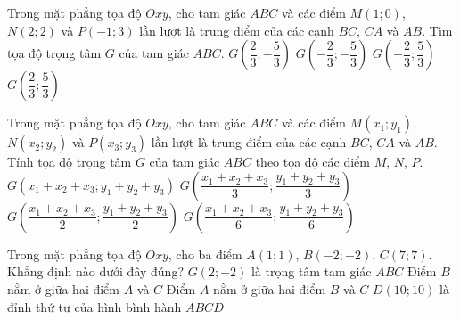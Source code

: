 \begin{ex}%
	Trong mặt phẳng tọa độ $Oxy$, cho tam giác $ABC$ và các điểm $M(1;0)$, $N(2;2)$ và $P(-1;3)$ lần lượt là trung điểm của các cạnh $BC$, $CA$ và $AB$. Tìm tọa độ trọng tâm $G$ của tam giác $ABC.$
	\choice
	{$G\left(\dfrac{2}{3};-\dfrac{5}{3}\right)$}
	{$G\left(-\dfrac{2}{3};-\dfrac{5}{3}\right)$}
	{$G\left(-\dfrac{2}{3};\dfrac{5}{3}\right)$}
	{\True $G\left(\dfrac{2}{3};\dfrac{5}{3}\right)$}
\end{ex}

\begin{ex}%
	Trong mặt phẳng tọa độ $Oxy$, cho tam giác $ABC$ và các điểm $M(x_1;y_1)$, $N(x_2;y_2)$ và $P(x_3;y_3)$ lần lượt là trung điểm của các cạnh $BC$, $CA$ và $AB$. Tính tọa độ trọng tâm $G$ của tam giác $ABC$ theo tọa độ các điểm $M$, $N$, $P$.
	\choice
	{$G\left(x_1+x_2+x_3;y_1+y_2+y_3\right)$}
	{\True $G\left(\dfrac{x_1+x_2+x_3}{3};\dfrac{y_1+y_2+y_3}{3}\right)$}
	{$G\left(\dfrac{x_1+x_2+x_3}{2};\dfrac{y_1+y_2+y_3}{2}\right)$}
	{$G\left(\dfrac{x_1+x_2+x_3}{6};\dfrac{y_1+y_2+y_3}{6}\right)$}
\end{ex}

\begin{ex}%
	Trong mặt phẳng tọa độ $Oxy$, cho ba điểm $A(1;1)$, $B(-2;-2)$, $C(7;7)$. Khẳng định nào dưới đây đúng?
	\choice
	{$G(2;-2)$ là trọng tâm tam giác $ABC$}
	{Điểm $B$ nằm ở giữa hai điểm $A$ và $C$}
	{\True Điểm $A$ nằm ở giữa hai điểm $B$ và $C$}
	{$D(10;10)$ là đỉnh thứ tư của hình bình hành $ABCD$}
\end{ex}

